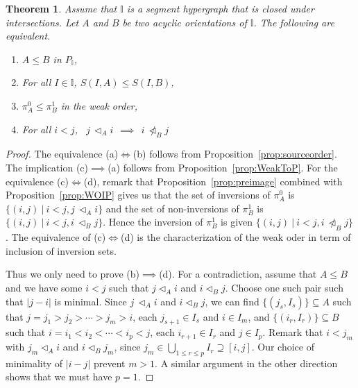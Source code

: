\documentclass[reqno]{amsart}
\newtheorem{theorem}{Theorem}[section]
\theoremstyle{definition}
\newcommand{\less}{\vartriangleleft} %
\newcommand{\II}{\mathbb I} %
\begin{document}
\begin{theorem}\label{thm:propertieofintI}
Assume that $\II$ is a segment hypergraph that is closed under intersections. Let $A$ and $B$ be two acyclic orientations of $\II$.
The following are equivalent.
\begin{enumerate}
	\item[{\rm (a)}] $A\le B$ in $P_\II$,
	\item[{\rm (b)}]  For all $I\in\II$, $S(I,A)\le S(I,B)$,
	\item[{\rm (c)}]  $\pi^0_A \le \pi^1_B$ in the weak order,
	\item[{\rm (d)}]  For all $i<j$, \ $j\,\less_Ai \ \ \implies\ \  i \,\not\less_B j$
\end{enumerate}
\end{theorem}

\begin{proof} The equivalence (a)$\iff$(b) follows from Proposition~\ref{prop:sourceorder}. The implication (c)$\implies$(a) follows from  Proposition~\ref{prop:WeakToP}.
For the equivalence (c)$\iff$(d), remark that Proposition~\ref{prop:preimage} combined with Proposition~\ref{prop:WOIP} gives us that the set of inversions of $\pi^0_A$
is $\big\{(i,j)\ |\  i<j, j\,\less_Ai \big\}$ and the set of non-inversions of $\pi^1_B$ is  $\big\{(i,j)\ |\  i<j, i\,\less_B j \big\}$. Hence the inversion of $\pi^1_B$ is  given $\big\{(i,j)\ |\  i<j, i\,\not\less_B j \big\}$.
The equivalence of (c)$\iff$(d) is the characterization of the weak oder in term of inclusion of inversion sets.

Thus we only need to prove (b)$\implies$(d). For a contradiction, assume that $A\le B$ and we have some $i<j$ such that $j\less_Ai$ and  $i \less_B j$. Choose one such pair such that $|j-i|$ is minimal.
Since $j\,\less_A i$ and $i \less_B j$, we can find
$\{(j_s,I_{s})\}\subseteq A$ such that $j=j_1>j_2>\cdots>j_m>i$, each $j_{s+1}\in I_s$ and $i\in I_m$, and 
$\{(i_r,I_{r})\}\subseteq B$ such that $i=i_1<i_2<\cdots<i_p<j$, each $i_{r+1}\in I_r$ and $j\in I_p$. Remark that $i<j_m$ with $j_m\less_A i$ and $i\less_B j_m$, since $j_m\in \bigcup_{1\le r\le p}I_r\supseteq [i,j]$.
Our choice of minimality of $|i-j|$ prevent $m>1$. A similar argument in the other direction shows that we must have $p=1$. 


\end{proof}
\end{document}
